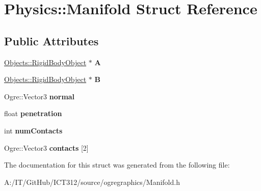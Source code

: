\hypertarget{struct_physics_1_1_manifold}{\section{Physics\-:\-:Manifold Struct Reference}
\label{struct_physics_1_1_manifold}
}
\subsection*{Public Attributes}
\begin{DoxyCompactItemize}
\item 
\hypertarget{struct_physics_1_1_manifold_a1e30105b5e90089624ff37220d8015d6}{\hyperlink{class_objects_1_1_rigid_body_object}{Objects\-::\-Rigid\-Body\-Object} $\ast$ {\bfseries A}}\label{struct_physics_1_1_manifold_a1e30105b5e90089624ff37220d8015d6}

\item 
\hypertarget{struct_physics_1_1_manifold_aecc0a4e62f050e1a3012438f55f9864e}{\hyperlink{class_objects_1_1_rigid_body_object}{Objects\-::\-Rigid\-Body\-Object} $\ast$ {\bfseries B}}\label{struct_physics_1_1_manifold_aecc0a4e62f050e1a3012438f55f9864e}

\item 
\hypertarget{struct_physics_1_1_manifold_a9527871c4cc0db46cf9ec6700e769681}{Ogre\-::\-Vector3 {\bfseries normal}}\label{struct_physics_1_1_manifold_a9527871c4cc0db46cf9ec6700e769681}

\item 
\hypertarget{struct_physics_1_1_manifold_a053bf2ecd6b844190e405b136fc275f6}{float {\bfseries penetration}}\label{struct_physics_1_1_manifold_a053bf2ecd6b844190e405b136fc275f6}

\item 
\hypertarget{struct_physics_1_1_manifold_a31706b3f6f81123ce5f4bc08c0af0be7}{int {\bfseries num\-Contacts}}\label{struct_physics_1_1_manifold_a31706b3f6f81123ce5f4bc08c0af0be7}

\item 
\hypertarget{struct_physics_1_1_manifold_ae222b04c78b6a07509ed8a4110cd9e97}{Ogre\-::\-Vector3 {\bfseries contacts} \mbox{[}2\mbox{]}}\label{struct_physics_1_1_manifold_ae222b04c78b6a07509ed8a4110cd9e97}

\end{DoxyCompactItemize}


The documentation for this struct was generated from the following file\-:\begin{DoxyCompactItemize}
\item 
A\-:/\-I\-T/\-Git\-Hub/\-I\-C\-T312/source/ogregraphics/Manifold.\-h\end{DoxyCompactItemize}
